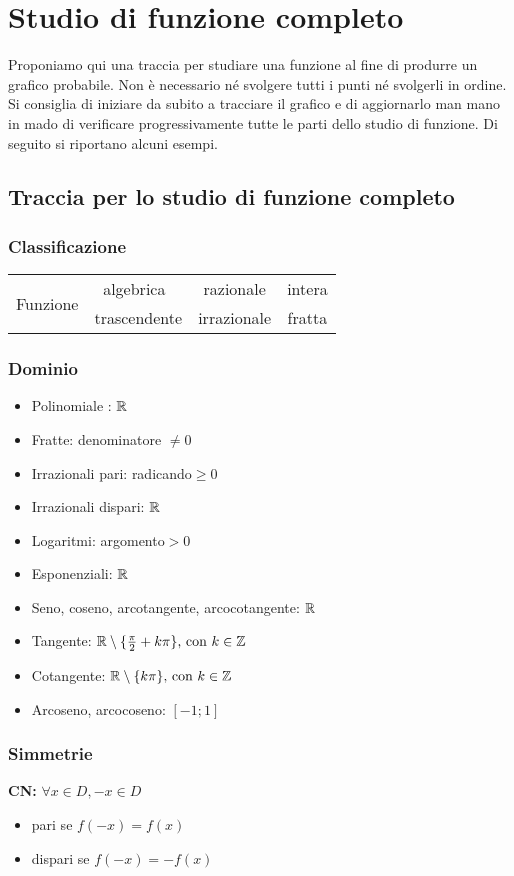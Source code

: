 \chapter{Studio di funzione completo}
Proponiamo qui una traccia per studiare una funzione al fine di produrre un grafico probabile. Non è necessario né svolgere tutti i punti né svolgerli in ordine. Si consiglia di iniziare da subito a tracciare il grafico e di aggiornarlo man mano in mado di verificare progressivamente tutte le parti dello studio di funzione. Di seguito si riportano alcuni esempi.
\section{Traccia per lo studio di funzione completo}
    \subsection{Classificazione}
    \begin{tabular}{|c|c|c|c|}
        \hline
        \multirow{2}{4em}{Funzione} & algebrica\ & razionale & intera\\ \cline{2-4}
         & trascendente & irrazionale & fratta \\ \hline
    \end{tabular}
    \subsection{Dominio}
    \begin{itemize}
        \item Polinomiale : $\mathbb{R}$
        \item Fratte: denominatore $\neq 0$
        \item Irrazionali pari: radicando$\geq0$
        \item Irrazionali dispari: $\mathbb{R}$
        \item Logaritmi: argomento$>0$
        \item Esponenziali: $\mathbb{R}$
        \item Seno, coseno, arcotangente, arcocotangente: $\mathbb{R}$
        \item Tangente: $\mathbb{R} \setminus \{\frac{\pi}{2}+k\pi\}\text{, con } k\in\mathbb{Z}$
        \item Cotangente: $\mathbb{R} \setminus \{k\pi\}\text{, con } k\in\mathbb{Z}$
        \item Arcoseno, arcocoseno: $[-1;1]$
    \end{itemize}
    \subsection{Simmetrie}
    \textbf{CN:} $\forall x \in D, -x \in D$
    \begin{itemize}
        \item pari se $f(-x)=f(x)$
        \item dispari se $f(-x)=-f(x)$
    \end{itemize}
